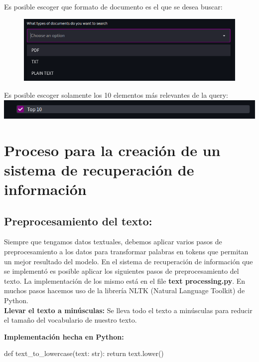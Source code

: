 \documentclass{llncs}
\begin{document}
\newpage
Es posible escoger que formato de documento es el que se desea buscar:

\begin{figure}[h]
    \includegraphics[scale = 0.8]{images/doc_format.png}
\end{figure}

Es posible escoger solamente los 10 elementos más relevantes de la query:\\

\includegraphics[scale = 0.7]{images/top_10.png}

\chapter*{Proceso para la creación de un sistema de recuperación de información}

\section{Preprocesamiento del texto:}

Siempre que tengamos datos textuales, debemos aplicar varios pasos de preprocesamiento a los 
datos para transformar palabras en tokens que permitan un mejor resultado del modelo.
En el sistema de recuperación de información que se implementó es posible aplicar 
los siguientes pasos de preprocesamiento del texto. La implementación de los mismo está en 
el file \textbf{text processing.py}. En muchos pasos hacemos uso de la librería NLTK (Natural Language Toolkit)
de Python.
\\

\noindent
\textbf{Llevar el texto a minúsculas:}
Se lleva todo el texto a minúsculas para reducir el tama\~{n}o del vocabulario de nuestro texto.

\noindent
\textbf{Implementación hecha en Python:}
\begin{python}
    def text_to_lowercase(text: str):
        return text.lower()
\end{python}
\end{document}
